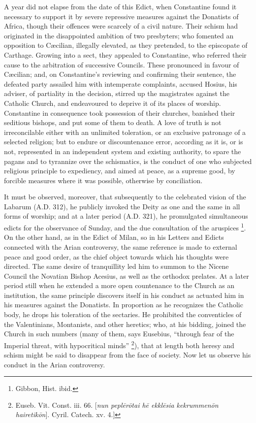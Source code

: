 A year did not elapse from the date of this Edict, when Constantine
found it necessary to support it by severe repressive measures against
the Donatists of Africa, though their offences were scarcely of a
civil nature. Their schism had originated in the disappointed ambition
of two presbyters; who fomented an opposition to Cæcilian, illegally
elevated, as they pretended, to the episcopate of Carthage. Growing
into a sect, they appealed to Constantine, who referred their cause to
the arbitration of successive Councils. These pronounced in favour of
Cæcilian; and, on Constantine's reviewing and confirming their
sentence, the defeated party assailed him with intemperate complaints,
accused Hosius, his adviser, of partiality in the decision, stirred up
the magistrates against the Catholic Church, and endeavoured to
deprive it of its places of worship. Constantine in consequence took
possession of their churches, banished their seditious bishops, and
put some of them to death. A love of truth is not irreconcilable
either with an unlimited toleration, or an exclusive patronage of a
selected religion; but to endure or discountenance error, according as
it is, or is not, represented in an independent system and existing
authority, to spare the pagans and to tyrannize over the
schismatics, is the conduct of one who subjected religious principle
to expediency, and aimed at peace, as a supreme good, by forcible
measures where it was possible, otherwise by conciliation.

It must be observed, moreover, that subsequently to the celebrated
vision of the Labarum (A.D. 312), he publicly
invoked the Deity as one and the same in all forms of worship; and at
a later period (A.D. 321), he promulgated
simultaneous edicts for the observance of Sunday, and the due
consultation of the aruspices \footnote{Gibbon, Hist. ibid.}.
On the other hand, as in the Edict of Milan, so in his Letters and
Edicts connected with the Arian controversy, the same reference is
made to external peace and good order, as the chief object towards
which his thoughts were directed. The same desire of tranquillity led
him to summon to the Nicene Council the Novatian Bishop Acesius, as
well as the orthodox prelates. At a later period still when he
extended a more open countenance to the Church as an institution, the
same principle discovers itself in his conduct as actuated him in his
measures against the Donatists. In proportion as he recognizes the
Catholic body, he drops his toleration of the sectaries. He prohibited
the conventicles of the Valentinians, Montanists, and other heretics;
who, at his bidding, joined the Church in such numbers (many of them,
says Eusebius, ``through fear of the Imperial threat, with
hypocritical minds'' \footnote{Euseb. Vit. Const. iii. 66. [\emph{nun pepl\={e}r\={o}tai
h\={e} ekkl\={e}sia kekrummen\={o}n hairetik\={o}n}].
Cyril. Catech. xv. 4.]}),
that at length both heresy and schism might be said to disappear from
the face of society. Now let us observe his conduct in the Arian
controversy.

